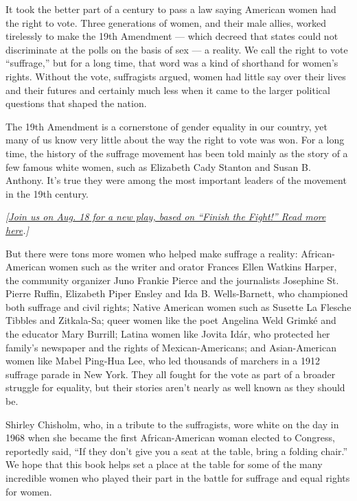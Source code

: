 It took the better part of a century to pass a law saying American women
had the right to vote. Three generations of women, and their male
allies, worked tirelessly to make the 19th Amendment --- which decreed
that states could not discriminate at the polls on the basis of sex ---
a reality. We call the right to vote ``suffrage,'' but for a long time,
that word was a kind of shorthand for women's rights. Without the vote,
suffragists argued, women had little say over their lives and their
futures and certainly much less when it came to the larger political
questions that shaped the nation.

The 19th Amendment is a cornerstone of gender equality in our country,
yet many of us know very little about the way the right to vote was won.
For a long time, the history of the suffrage movement has been told
mainly as the story of a few famous white women, such as Elizabeth Cady
Stanton and Susan B. Anthony. It's true they were among the most
important leaders of the movement in the 19th century.

\emph{{[}}\href{https://www.nytimes.com/2020/07/23/theater/finish-the-fight-suffrage-centennial-performance.html}{\emph{Join
us on Aug. 18 for a new play, based on ``Finish the Fight!'' Read more
here}}\emph{.{]}}

But there were tons more women who helped make suffrage a reality:
African-American women such as the writer and orator Frances Ellen
Watkins Harper, the community organizer Juno Frankie Pierce and the
journalists Josephine St. Pierre Ruffin, Elizabeth Piper Ensley and Ida
B. Wells-Barnett, who championed both suffrage and civil rights; Native
American women such as Susette La Flesche Tibbles and Zitkala-Sa; queer
women like the poet Angelina Weld Grimké and the educator Mary Burrill;
Latina women like Jovita Idár, who protected her family's newspaper and
the rights of Mexican-Americans; and Asian-American women like Mabel
Ping-Hua Lee, who led thousands of marchers in a 1912 suffrage parade in
New York. They all fought for the vote as part of a broader struggle for
equality, but their stories aren't nearly as well known as they should
be.

Shirley Chisholm, who, in a tribute to the suffragists, wore white on
the day in 1968 when she became the first African-American woman elected
to Congress, reportedly said, ``If they don't give you a seat at the
table, bring a folding chair.'' We hope that this book helps set a place
at the table for some of the many incredible women who played their part
in the battle for suffrage and equal rights for women.

